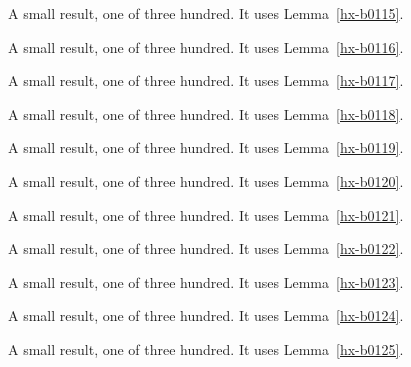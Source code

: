 \begin{lemma}[Bulk 116]\label{hx-b0116}
A small result, one of three hundred. It uses Lemma~\ref{hx-b0115}.
\end{lemma}

\begin{lemma}[Bulk 117]\label{hx-b0117}
A small result, one of three hundred. It uses Lemma~\ref{hx-b0116}.
\end{lemma}

\begin{lemma}[Bulk 118]\label{hx-b0118}
A small result, one of three hundred. It uses Lemma~\ref{hx-b0117}.
\end{lemma}

\begin{lemma}[Bulk 119]\label{hx-b0119}
A small result, one of three hundred. It uses Lemma~\ref{hx-b0118}.
\end{lemma}

\begin{lemma}[Bulk 120]\label{hx-b0120}
A small result, one of three hundred. It uses Lemma~\ref{hx-b0119}.
\end{lemma}

\begin{lemma}[Bulk 121]\label{hx-b0121}
A small result, one of three hundred. It uses Lemma~\ref{hx-b0120}.
\end{lemma}

\begin{lemma}[Bulk 122]\label{hx-b0122}
A small result, one of three hundred. It uses Lemma~\ref{hx-b0121}.
\end{lemma}

\begin{lemma}[Bulk 123]\label{hx-b0123}
A small result, one of three hundred. It uses Lemma~\ref{hx-b0122}.
\end{lemma}

\begin{lemma}[Bulk 124]\label{hx-b0124}
A small result, one of three hundred. It uses Lemma~\ref{hx-b0123}.
\end{lemma}

\begin{lemma}[Bulk 125]\label{hx-b0125}
A small result, one of three hundred. It uses Lemma~\ref{hx-b0124}.
\end{lemma}

\begin{lemma}[Bulk 126]\label{hx-b0126}
A small result, one of three hundred. It uses Lemma~\ref{hx-b0125}.
\end{lemma}

